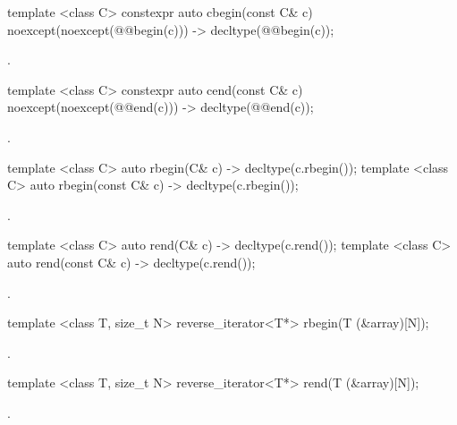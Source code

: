 %
\begin{itemdecl}
template <class C> constexpr auto cbegin(const C& c) noexcept(noexcept(@@begin(c)))
  -> decltype(@@begin(c));
\end{itemdecl}
\begin{itemdescr}
\pnum \returns {}.
\end{itemdescr}

%
\begin{itemdecl}
template <class C> constexpr auto cend(const C& c) noexcept(noexcept(@@end(c)))
  -> decltype(@@end(c));
\end{itemdecl}
\begin{itemdescr}
\pnum \returns {}.
\end{itemdescr}

%
\begin{itemdecl}
template <class C> auto rbegin(C& c) -> decltype(c.rbegin());
template <class C> auto rbegin(const C& c) -> decltype(c.rbegin());
\end{itemdecl}
\begin{itemdescr}
\pnum \returns {}.
\end{itemdescr}

%
\begin{itemdecl}
template <class C> auto rend(C& c) -> decltype(c.rend());
template <class C> auto rend(const C& c) -> decltype(c.rend());
\end{itemdecl}
\begin{itemdescr}
\pnum \returns {}.
\end{itemdescr}

%
\begin{itemdecl}
template <class T, size_t N> reverse_iterator<T*> rbegin(T (&array)[N]);
\end{itemdecl}
\begin{itemdescr}
\pnum \returns {}.
\end{itemdescr}

%
\begin{itemdecl}
template <class T, size_t N> reverse_iterator<T*> rend(T (&array)[N]);
\end{itemdecl}
\begin{itemdescr}
\pnum \returns {}.
\end{itemdescr}

